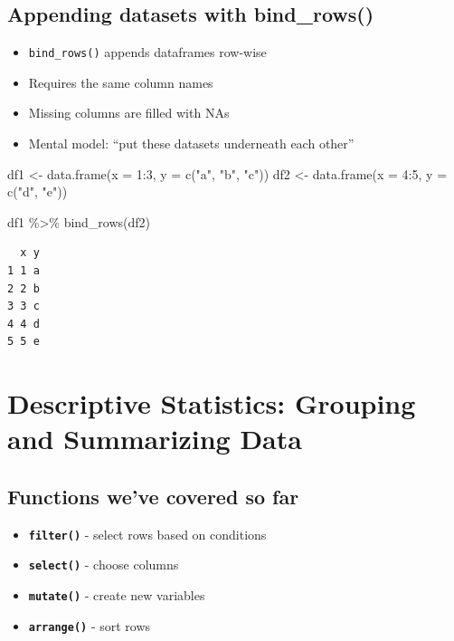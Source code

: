 \documentclass[
  letterpaper,
  DIV=11,
  numbers=noendperiod]{scrartcl}
\newenvironment{Shaded}{\begin{snugshade}}{\end{snugshade}}
\newcommand{\AttributeTok}[1]{\textcolor[rgb]{0.40,0.45,0.13}{#1}}
\newcommand{\DecValTok}[1]{\textcolor[rgb]{0.68,0.00,0.00}{#1}}
\newcommand{\FunctionTok}[1]{\textcolor[rgb]{0.28,0.35,0.67}{#1}}
\newcommand{\NormalTok}[1]{\textcolor[rgb]{0.00,0.23,0.31}{#1}}
\newcommand{\OtherTok}[1]{\textcolor[rgb]{0.00,0.23,0.31}{#1}}
\newcommand{\SpecialCharTok}[1]{\textcolor[rgb]{0.37,0.37,0.37}{#1}}
\newcommand{\StringTok}[1]{\textcolor[rgb]{0.13,0.47,0.30}{#1}}
\providecommand{\tightlist}{%
  \setlength{\itemsep}{0pt}\setlength{\parskip}{0pt}}
\begin{document}
\subsection{Appending datasets with
bind\_rows()}\label{appending-datasets-with-bind_rows}

\begin{itemize}
\tightlist
\item
  \texttt{bind\_rows()} appends dataframes row-wise
\item
  Requires the same column names
\item
  Missing columns are filled with NAs
\item
  Mental model: ``put these datasets underneath each other''
\end{itemize}

\begin{Shaded}
\begin{Highlighting}[]
\NormalTok{df1 }\OtherTok{\textless{}{-}} \FunctionTok{data.frame}\NormalTok{(}\AttributeTok{x =} \DecValTok{1}\SpecialCharTok{:}\DecValTok{3}\NormalTok{, }\AttributeTok{y =} \FunctionTok{c}\NormalTok{(}\StringTok{"a"}\NormalTok{, }\StringTok{"b"}\NormalTok{, }\StringTok{"c"}\NormalTok{))}
\NormalTok{df2 }\OtherTok{\textless{}{-}} \FunctionTok{data.frame}\NormalTok{(}\AttributeTok{x =} \DecValTok{4}\SpecialCharTok{:}\DecValTok{5}\NormalTok{, }\AttributeTok{y =} \FunctionTok{c}\NormalTok{(}\StringTok{"d"}\NormalTok{, }\StringTok{"e"}\NormalTok{))}

\NormalTok{df1 }\SpecialCharTok{\%\textgreater{}\%} \FunctionTok{bind\_rows}\NormalTok{(df2)}
\end{Highlighting}
\end{Shaded}

\begin{verbatim}
  x y
1 1 a
2 2 b
3 3 c
4 4 d
5 5 e
\end{verbatim}

\section{Descriptive Statistics: Grouping and Summarizing
Data}\label{descriptive-statistics-grouping-and-summarizing-data}

\subsection{Functions we've covered so
far}\label{functions-weve-covered-so-far}

\begin{itemize}
\tightlist
\item
  \textbf{\texttt{filter()}} - select rows based on conditions
\item
  \textbf{\texttt{select()}} - choose columns
\item
  \textbf{\texttt{mutate()}} - create new variables
\item
  \textbf{\texttt{arrange()}} - sort rows
\end{itemize}
\end{document}
